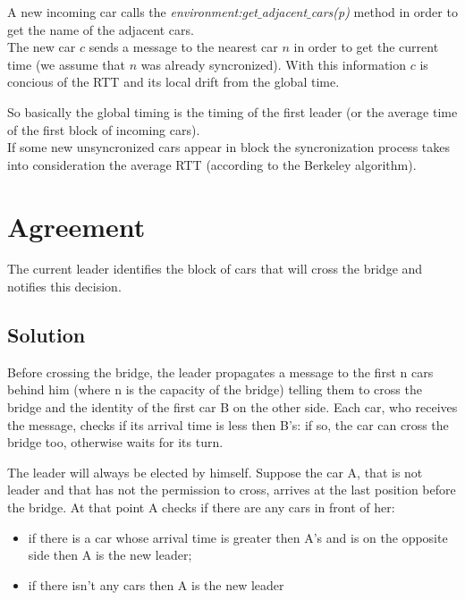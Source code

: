 A new incoming car calls the \textit{environment:get$\_$adjacent$\_$cars(p)} 
method in order to get the name of the adjacent cars. \\

The new car $c$ sends a message to the nearest car $n$ in order to get the current time 
(we assume that $n$ was already syncronized). 
With this information $c$ is concious of the RTT and its local drift from the global time. 

So basically the global timing is the timing of the first leader (or the average time 
of the first block of incoming cars).\\

If some new unsyncronized cars appear in block the syncronization process takes into 
consideration the average RTT (according to the Berkeley algorithm). 


\section{Agreement}

The current leader identifies the block of cars that will cross the bridge and notifies
this decision.  

\subsection{Solution}

Before crossing the bridge, the leader propagates a message to 
the first n cars behind him (where n is the capacity of the bridge) telling them to cross the bridge
and the identity of the first car B on the other side. Each car, who 
receives the message, checks if its arrival time is less then B's: if so, the car can 
cross the bridge too, otherwise waits for its turn.

The leader will always be elected by himself. Suppose the car A, that is not leader
 and that has not the permission to cross, arrives at the last position
before the bridge. At that point A checks if there are any cars in front of her:
\begin{itemize}
\item if there is a car whose arrival time is greater then A's and is on the opposite side
then A is the new leader;
\item if there isn't any cars then A is the new leader 
\end{itemize}



